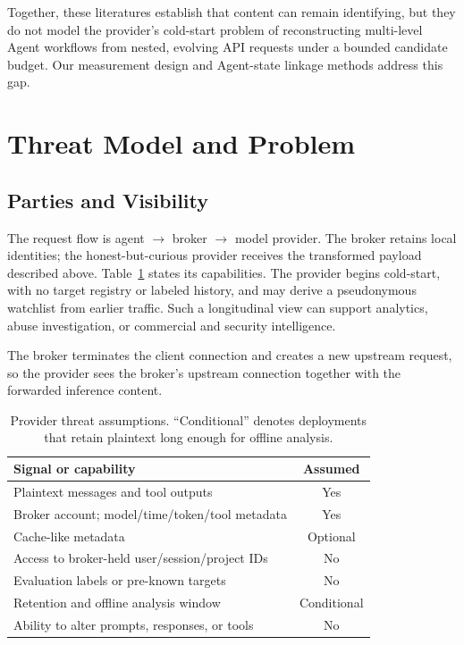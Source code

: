 \documentclass[letterpaper]{article} %
\begin{document}
Together, these literatures establish that content can remain identifying, but they do not model the
provider's cold-start problem of reconstructing multi-level Agent workflows from nested, evolving API
requests under a bounded candidate budget. Our measurement design and Agent-state linkage methods
address this gap.

\section{Threat Model and Problem}

\subsection{Parties and Visibility}

The request flow is agent $\rightarrow$ broker $\rightarrow$ model provider. The broker retains local
identities; the honest-but-curious provider receives the transformed payload described above.
Table~\ref{tab:assumptions} states its capabilities. The provider begins cold-start, with no target
registry or labeled history, and may derive a pseudonymous watchlist from earlier traffic. Such a
longitudinal view can support analytics, abuse investigation, or commercial and security
intelligence.

The broker terminates the client connection and creates a new upstream request, so the provider sees
the broker's upstream connection together with the forwarded inference content.

\begin{table}[t]
\centering
\small
\begin{tabular}{@{}p{}c@{}}
\toprule
Signal or capability & Assumed \\
\midrule
Plaintext messages and tool outputs & Yes \\
Broker account; model/time/token/tool metadata & Yes \\
Cache-like metadata & Optional \\
Access to broker-held user/session/project IDs & No \\
Evaluation labels or pre-known targets & No \\
Retention and offline analysis window & Conditional \\
Ability to alter prompts, responses, or tools & No \\
\bottomrule
\end{tabular}
\caption{Provider threat assumptions. ``Conditional'' denotes deployments that retain plaintext
long enough for offline analysis.}
\label{tab:assumptions}
\end{table}
\end{document}
